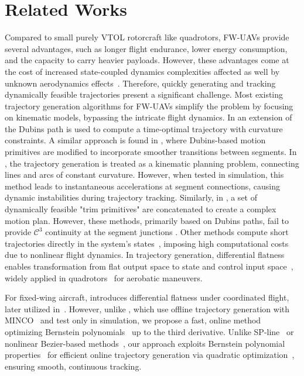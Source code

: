 \section{Related Works}
\label{Sec:Related_Works}
\vspace{-8pt}
Compared to small purely VTOL rotorcraft like quadrotors, FW-UAVs provide several advantages, such as longer flight endurance, lower energy consumption, and the capacity to carry heavier payloads. However, these advantages come at the cost of increased state-coupled dynamics complexities affected as well by unknown aerodynamics effects~\cite{Dobrokhodov2020}. 
Therefore, quickly generating and tracking dynamically feasible trajectories present a significant challenge. Most existing trajectory generation algorithms for FW-UAVs simplify the problem by focusing on kinematic models, bypassing the intricate flight dynamics. In \cite{Chitsaz} an extension of the Dubins path is used to compute a time-optimal trajectory with curvature constraints. A similar approach is found in \cite{ryu2023path}, where Dubins-based motion primitives are modified to incorporate smoother transitions between segments. In \cite{Wang},  the trajectory generation is treated as a kinematic planning problem, connecting lines and arcs of constant curvature. However, when tested in simulation, this method leads to instantaneous accelerations at segment connections, causing dynamic instabilities during trajectory tracking.
Similarly, in \cite{Frazzoli}, a set of dynamically feasible "trim primitives" are concatenated to create a complex motion plan. However, these methods, primarily based on Dubins paths, fail to provide $\mathcal{C}^3$ continuity at the segment junctions \cite{Gros, Johannes}.
Other methods compute short trajectories directly in the system’s states~\cite{Barry, Levin}, imposing high computational costs due to nonlinear flight dynamics. In trajectory generation, differential flatness~\cite{Nieuwstadt} enables transformation from flat output space to state and control input space~\cite{Martin}, widely applied in quadrotors~\cite{Mellinger} for aerobatic maneuvers.

For fixed-wing aircraft, \cite{hauser1997aggressive} introduces differential flatness under coordinated flight, later utilized in~\cite{Bry2015AggressiveFO, Liu}. However, unlike \cite{Liu, Guozheng}, which use offline trajectory generation with MINCO~\cite{wang2022geometrically} and test only in simulation, we propose a fast, online method optimizing Bernstein polynomials~\cite{kielas2019bebot} up to the third derivative. Unlike SP-line~\cite{Johannes_book, Tal} or nonlinear Bezier-based methods~\cite{Celestini}, our approach exploits Bernstein polynomial properties~\cite{kielas2019bebot} for efficient online trajectory generation via quadratic optimization~\cite{GertzOSQP}, ensuring smooth, continuous tracking.

